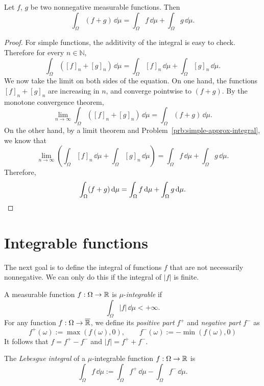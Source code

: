 \begin{proposition}
	\label{pr:additivity-integral-nonneg}
	Let $f$, $g$ be two nonnegative measurable functions. Then
	\[
		\int_\Omega (f + g)\, \dd \mu = \int_\Omega f\, \dd \mu + \int_\Omega g\, \dd \mu.
	\]	
\end{proposition}
\begin{proof}
	For simple functions, the additivity of the integral is easy to check. Therefore for every $n \in \mathbb{N}$,
	\[
	\int_\Omega ([f]_n + [g]_n)\, \dd \mu = \int_\Omega [f]_n\, \dd \mu + \int_\Omega [g]_n\, \dd \mu.
	\]
	We now take the limit on both sides of the equation. On one hand, the functions $[f]_n + [g]_n$ are increasing in $n$, and converge pointwise to $(f + g)$. By the monotone convergence theorem,
	\[
	\lim_{n \to \infty} \int_\Omega ([f]_n + [g]_n)\, \dd \mu = 
	\int_\Omega ( f + g)\, \dd \mu.
	\]
	On the other hand, by a limit theorem and Problem~\ref{prb:simple-approx-integral}, we know that 
	\[
	\lim_{n \to \infty} \left( \int_\Omega [f]_n\, \dd \mu + \int_\Omega [g]_n\, \dd \mu \right) = \int_\Omega f\, \dd \mu + \int_\Omega g\, \dd \mu.
	\]
	Therefore,
	\[
	\int_\Omega (f + g)\, \mathrm{d} \mu = \int_\Omega f\, \mathrm{d} \mu + \int_\Omega g\, \mathrm{d} \mu.\qedhere
	\]
\end{proof}


\section{Integrable functions}\label{sec:integrable}

The next goal is to define the integral of functions $f$ that are not necessarily nonnegative. We can only do this if the integral of $|f|$ is finite.

\begin{definition}
	A measurable function $f: \Omega \to \mathbb R$ is $\mu$-\emph{integrable} if 
	\[
	\int_\Omega |f|\, \dd \mu < +\infty.	
	\]
	For any function $f: \Omega \to \overline{\mathbb R}$, we define its \emph{positive part} $f^+$ and \emph{negative part} $f^-$ as
\[
	f^+(\omega) := \max( f(\omega), 0 ),\qquad 
	f^-(\omega) := - \min( f(\omega), 0 ) 
\]
It follows that $f = f^+ - f^-$ and $|f| = f^+ + f^-$.

	The \emph{Lebesgue integral} of a $\mu$-integrable function $f: \Omega \to \mathbb R$ is
	\[
		\int_\Omega f\,\dd \mu := \int_\Omega f^+\, \dd \mu - \int_\Omega f^-\, \dd \mu.
	\]
\end{definition}

